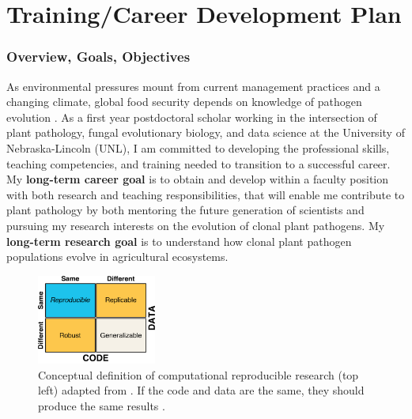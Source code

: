 \documentclass[12pt,letterpaper]{article}
\title{\ruleline{Project Narrative}}
\begin{document}
\maketitle


\section{Training/Career Development Plan}
\subsubsection*{Overview, Goals, Objectives}
As environmental pressures mount from current management practices and a changing climate, global food security depends on knowledge of pathogen evolution \citep{croll2016genetic,grunwald2016population,stukenbrock2013evolution}. 
As a first year postdoctoral scholar working in the intersection of plant pathology, fungal evolutionary biology, and data science at the University of Nebraska-Lincoln (UNL), I am committed to developing the professional skills, teaching competencies, and training needed to transition to a successful career. 
My \textbf{long-term career goal} is to obtain and develop within a faculty position with both research and teaching responsibilities, that will enable me contribute to plant pathology by both mentoring the future generation of scientists and pursuing my research interests on the evolution of clonal plant pathogens. 
My \textbf{long-term research goal} is to understand how clonal plant pathogen populations evolve in agricultural ecosystems. 
\begin{figure}
  \includegraphics[width=0.35\textwidth]{figure/whitaker2017publishing.pdf}
  \caption{Conceptual definition of computational reproducible research (top left) adapted from \citet{whitaker2017publishing}. If the code and data are the same, they should produce the same results \citep{patil2016statistical}.
  }
  \label{fig:rr-def}
\end{figure}
\end{document}
